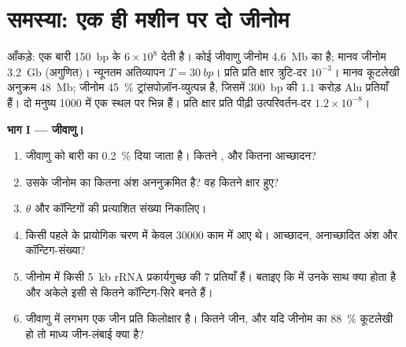 \section{समस्या: एक ही मशीन पर दो जीनोम}

\begin{problem}
\label{pb:b3:genomics:1}
आँकड़े: एक बारी \qty{150}{bp} के $6\times 10^{8}$  देती है। कोई
जीवाणु जीनोम \qty{4.6}{Mb} का है; मानव जीनोम \qty{3.2}{Gb}
(अगुणित)। न्यूनतम अतिव्यापन $T = \qty{30}{bp}$। प्रति  प्रति क्षार
त्रुटि-दर $10^{-3}$। मानव कूटलेखी अनुक्रम \qty{48}{Mb}; जीनोम
\qty{45}{\%} ट्रांसपोज़ॉन-व्युत्पन्न है, जिसमें \qty{300}{bp} की $1.1$
करोड़ Alu प्रतियाँ हैं। दो मनुष्य \num{1000} में एक स्थल पर भिन्न हैं।
प्रति क्षार प्रति पीढ़ी उत्परिवर्तन-दर $1.2\times 10^{-8}$।

\medskip
\noindent\textbf{भाग I --- जीवाणु।}
\begin{enumerate}
  \item जीवाणु को बारी का \qty{0.2}{\%} दिया जाता है। कितने , और
        कितना आच्छादन?
  \item उसके जीनोम का कितना अंश अननुक्रमित है? वह कितने क्षार हुए?
  \item $\theta$ और कॉन्टिगों की प्रत्याशित संख्या निकालिए।
  \item किसी पहले के प्रायोगिक चरण में केवल \num{30000}  काम में
        आए थे। आच्छादन, अनाच्छादित अंश और कॉन्टिग-संख्या?
  \item जीनोम में किसी \qty{5}{kb} rRNA प्रकार्यगुच्छ की \num{7}
        प्रतियाँ हैं। बताइए कि  में उनके साथ क्या होता है और
        अकेले इसी से कितने कॉन्टिग-सिरे बनते हैं।
  \item जीवाणु में लगभग एक जीन प्रति किलोक्षार है। कितने जीन, और यदि
        जीनोम का \qty{88}{\%} कूटलेखी हो तो माध्य जीन-लंबाई क्या है?
\end{enumerate}


\end{problem}
